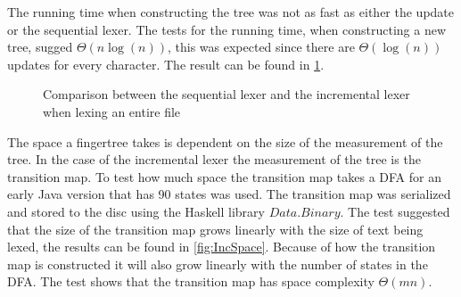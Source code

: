 The running time when constructing the tree was not as fast as either the update
or the sequential lexer. The tests for the running time, when constructing a new
tree, sugged $\Theta (n\log(n))$, this was expected since there are
$\Theta(\log(n))$ updates for every character. The result can be found in
\cref{fig:IncNewTime}.

\begin{figure}[!h]
\caption{Comparison between the sequential lexer and the incremental lexer when
         lexing an entire file\label{fig:IncNewTime}}
\end{figure}

The space a fingertree takes is dependent on the size of the measurement of the
tree. In the case of the incremental lexer the measurement of the tree is the
transition map. To test how much space the transition map takes a DFA for an
early Java version that has 90 states was used. The transition map was
serialized and stored to the disc using the Haskell library $Data.Binary$. The
test suggested that the size of the transition map grows linearly with the size
of text being lexed, the results can be found in \cref{fig:IncSpace}. Because of
how the transition map is constructed it will also grow linearly with the number
of states in the DFA. The test shows that the transition map has space
complexity $\Theta(mn)$.

